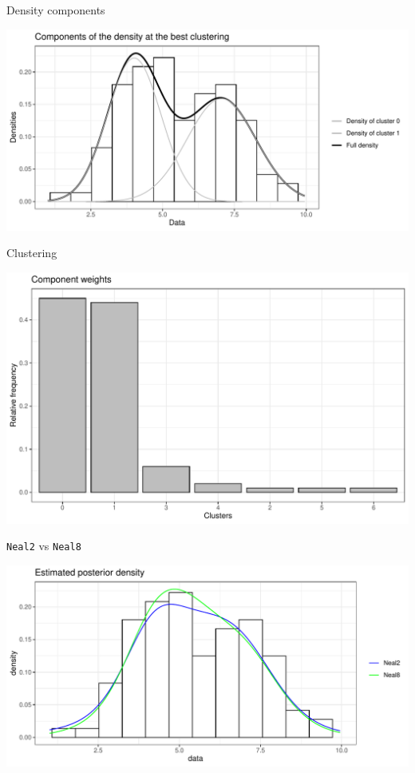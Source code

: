 \begin{frame}{Density components}

\begin{center}
		\includegraphics[scale=0.6]{etc/componentsM025m3_best.pdf}
	\end{center}
\end{frame}


\begin{frame}{Clustering}

\begin{center}
		\includegraphics[scale=0.5]{etc/barplotM1m3.pdf}
	\end{center}
\end{frame}



\begin{frame}{\texttt{Neal2} vs \texttt{Neal8}}

\begin{center}
		\includegraphics[scale=0.5]{etc/neal2_M10.pdf}
	\end{center}
	
\end{frame}


